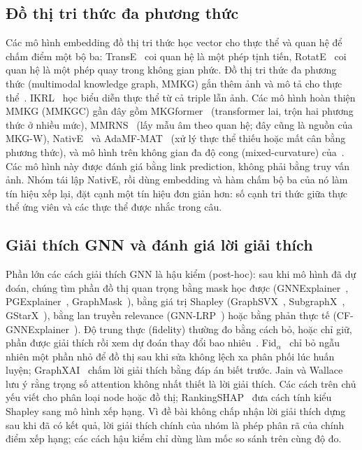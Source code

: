 \subsection{Đồ thị tri thức đa phương thức}

Các mô hình embedding đồ thị tri thức học vector cho thực thể và quan hệ để chấm điểm một bộ ba:
TransE~\cite{rw-bordes2013transe} coi quan hệ là một phép tịnh tiến, RotatE~\cite{sun2019rotate} coi quan hệ là một phép
quay trong không gian phức. Đồ thị tri thức đa phương thức (multimodal knowledge graph, MMKG) gắn thêm ảnh và mô tả cho
thực thể~\cite{rw-chen2024mmkgsurvey}. IKRL~\cite{rw-xie2017ikrl} học biểu diễn thực thể từ cả triple lẫn ảnh. Các mô hình
hoàn thiện MMKG (MMKGC) gần đây gồm MKGformer~\cite{rw-chen2022mkgformer} (transformer lai, trộn hai phương thức ở nhiều
mức), MMRNS~\cite{xu2022mmrns} (lấy mẫu âm theo quan hệ; đây cũng là nguồn của MKG-W), NativE~\cite{zhang2024native} và
AdaMF-MAT~\cite{rw-zhang2024adamf} (xử lý thực thể thiếu hoặc mất cân bằng phương thức), và mô hình trên không gian đa độ
cong (mixed-curvature) của~\cite{rw-gao2025mixedcurvature}. Các mô hình này được đánh giá bằng link prediction, không phải
bằng truy vấn ảnh. Nhóm tái lập NativE, rồi dùng embedding và hàm chấm bộ ba của nó làm tín hiệu xếp lại, đặt cạnh một tín
hiệu đơn giản hơn: số cạnh tri thức giữa thực thể ứng viên và các thực thể được nhắc trong câu.

\subsection{Giải thích GNN và đánh giá lời giải thích}

Phần lớn các cách giải thích GNN là hậu kiểm (post-hoc): sau khi mô hình đã dự đoán, chúng tìm phần đồ thị quan trọng bằng
mask học được (GNNExplainer~\cite{xai-ying2019gnnexplainer}, PGExplainer~\cite{xai-luo2020pgexplainer},
GraphMask~\cite{xai-schlichtkrull2021graphmask}), bằng giá trị Shapley (GraphSVX~\cite{xai-duval2021graphsvx},
SubgraphX~\cite{xai-yuan2021subgraphx}, GStarX~\cite{xai-zhang2022gstarx}), bằng lan truyền relevance
(GNN-LRP~\cite{xai-schnake2022gnnlrp}) hoặc bằng phản thực tế (CF-GNNExplainer~\cite{xai-lucic2022cfgnn}). Độ trung thực
(fidelity) thường đo bằng cách bỏ, hoặc chỉ giữ, phần được giải thích rồi xem dự đoán thay đổi bao
nhiêu~\cite{xai-yuan2023survey}. Fid$_\alpha$~\cite{xai-zheng2024fidalpha} chỉ bỏ ngẫu nhiên một phần nhỏ để đồ thị sau khi
sửa không lệch xa phân phối lúc huấn luyện; GraphXAI~\cite{xai-agarwal2023graphxai} chấm lời giải thích bằng đáp án biết
trước. Jain và Wallace~\cite{xai-jain2019attention} lưu ý rằng trọng số attention không nhất thiết là lời giải thích. Các
cách trên chủ yếu viết cho phân loại node hoặc đồ thị; RankingSHAP~\cite{xai-heuss2025rankingshap} đưa cách tính kiểu
Shapley sang mô hình xếp hạng. Vì đề bài không chấp nhận lời giải thích dựng sau khi đã có kết quả, lời giải thích chính
của nhóm là phép phân rã của chính điểm xếp hạng; các cách hậu kiểm chỉ dùng làm mốc so sánh trên cùng độ đo.

